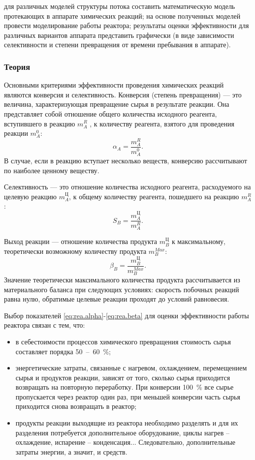 
\goal для различных моделей структуры потока составить математическую модель протекающих в аппарате химических реакций; на основе полученных моделей провести моделирование работы реактора; результаты оценки эффективности для различных вариантов аппарата представить графически (в виде зависимости селективности и степени превращения от времени пребывания в аппарате).

\subsubsection{Теория}
Основными критериями эффективности проведения химических реакций являются конверсия и селективность. 
Конверсия (степень превращения) --- это величина, характеризующая превращение сырья в результате реакции. Она представляет собой отношение общего количества исходного реагента, вступившего в реакцию $m_A^R$ , к количеству реагента, взятого для проведения реакции $m_A^0$:
\begin{equation}\label{eq:rea.alpha}
	\alpha_A = \dfrac{m_A^R}{m_A^0}.
\end{equation}
В случае, если в реакцию вступает несколько веществ, конверсию рассчитывают по наиболее ценному веществу.  

Селективность --- это отношение количества исходного реагента, расходуемого на целевую реакцию $m_A^Ц$, к общему количеству реагента, пошедшего на реакцию $m_A^R$:
\begin{equation}\label{eq:rea.s}
	S_B= \dfrac{m_A^Ц}{m_A^R}.
\end{equation}

Выход реакции --- отношение количества продукта $m_B^Ц$ к максимальному, теоретически возможному количеству продукта $m_B^{Max}$:
\begin{equation}\label{eq:rea.beta}
	\beta_B=\dfrac{m_B^Ц}{m_B^{Max}}.
\end{equation}
Значение теоретически максимального количества продукта рассчитывается из материального баланса при следующих условиях: скорость побочных реакций равна нулю, обратимые целевые реакции проходят до условий равновесия.

Выбор показателей \eqref{eq:rea.alpha}-\eqref{eq:rea.beta} для оценки эффективности работы реактора связан с тем, что:
\begin{itemize}
	\item в себестоимости процессов химического превращения стоимость сырья составляет порядка 50\ --\ 60\ \%;
	\item энергетические затраты, связанные с нагревом, охлаждением, перемещением сырья и продуктов реакции, зависят от того, сколько сырья приходится возвращать на повторную переработку. При конверсии 100\ \% все сырье пропускается через реактор один раз, при меньшей конверсии часть сырья приходится снова возвращать в реактор;
	\item продукты реакции выходящие из реактора необходимо разделять и для их разделения потребуется дополнительное  оборудование, циклы нагрев -- охлаждение, испарение -- конденсация... Следовательно, дополнительные затраты энергии, а значит, и средств.
\end{itemize}

